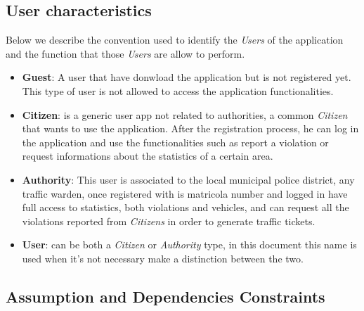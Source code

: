 \documentclass{article}
\begin{document}
\subsection{User characteristics}
Below we describe the convention used to identify the \textit{Users} of the application and the function that those 
\textit{Users} are allow to perform.
\begin{itemize}
    \item \textbf{Guest}: A user that have donwload the application but is not 
    registered yet. This type of user is not allowed to access 
    the application functionalities.
    \item \textbf{Citizen}: is a generic user app not related to authorities, a 
    common \textit{Citizen} that wants to use the application. After the registration process, he can 
    log in the application and use the functionalities such as report a violation or request 
    informations about the statistics of a certain area.
    \item \textbf{Authority}: This user is associated to the local municipal
    police district, any traffic warden, once registered with 
    is matricola number and logged in have full access to statistics, both violations and vehicles, and 
    can request all the violations reported from \textit{Citizens} in order to generate traffic tickets. 
    \item \textbf{User}: can be both a \textit{Citizen} or \textit{Authority} type, in this document
    this name is used when it's not necessary make a distinction 
    between the two.
\end{itemize}

\subsection{Assumption and Dependencies Constraints}
\end{document}
